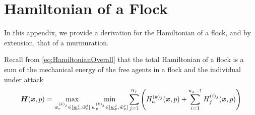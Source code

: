 \section{Hamiltonian of a Flock}
\label{app:ham}

In this appendix, we provide a derivation for the Hamiltonian of a flock, and by extension, that of a murmuration.

Recall from \eqref{eq:HamiltonianOverall} 
that the total Hamiltonian of a flock is a sum of the mechanical energy of the free agents in a flock and the individual under attack \ie
%
\begin{align}
	\bm{H}(\bm{x}, p) = \max_{w_e^{(k)_j} \in [\underline{w}_e^j, \bar{w}_e^j]}  \min_{w_p^{(k)_j}  \in [\underline{w}_p^{j}, \bar{w}_p^j]} \sum_{j=1}^{n_f} \left( H^{(k)_j}_a(\bm{x}, p) + \sum_{i=1}^{n_a-1} H^{(i)_j}_f(\bm{x}, p)  \right)
\end{align}

